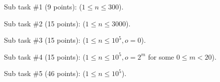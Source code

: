 Sub task \#1 (9 points): ($1 \leq n \leq 300$).

Sub task \#2 (15 points): ($1 \leq n \leq 3000$).

Sub task \#3 (15 points): ($1 \leq n \leq 10^5 , o=0$).

Sub task \#4 (15 points): ($1 \leq n \leq 10^5 , o=2^m$ for some $0\le m < 20$).

Sub task \#5 (46 points): ($1 \leq n \leq 10^5$).